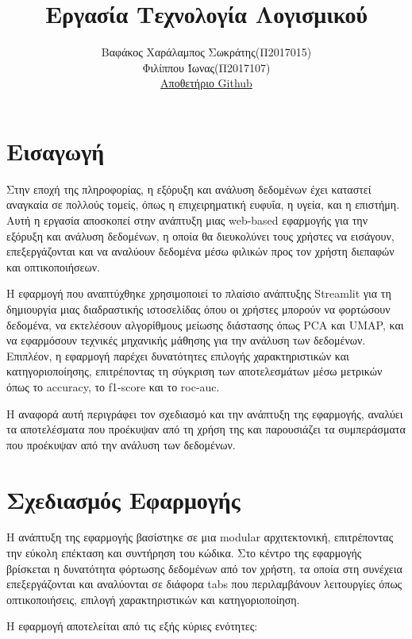 \documentclass[a4paper,12pt]{article}
\title{Εργασία Τεχνολογία Λογισμικού}
\author{Βαφάκος Χαράλαμπος Σωκράτης(Π2017015) \\  Φιλίππου Ίωνας(Π2017107)
\\ \href{https://github.com/Vafakos/HY-320-Software-Engineering-Project}{Αποθετήριο Github}}
\date{}
\begin{document}
\maketitle

\section{Εισαγωγή}
Στην εποχή της πληροφορίας, η εξόρυξη και ανάλυση δεδομένων έχει καταστεί αναγκαία σε πολλούς τομείς, όπως η επιχειρηματική ευφυΐα, η υγεία, και η επιστήμη. Αυτή η εργασία αποσκοπεί στην ανάπτυξη μιας web-based εφαρμογής για την εξόρυξη και ανάλυση δεδομένων, η οποία θα διευκολύνει τους χρήστες να εισάγουν, επεξεργάζονται και να αναλύουν δεδομένα μέσω φιλικών προς τον χρήστη διεπαφών και οπτικοποιήσεων.

Η εφαρμογή που αναπτύχθηκε χρησιμοποιεί το πλαίσιο ανάπτυξης Streamlit για τη δημιουργία μιας διαδραστικής ιστοσελίδας όπου οι χρήστες μπορούν να φορτώσουν δεδομένα, να εκτελέσουν αλγορίθμους μείωσης διάστασης όπως PCA και UMAP, και να εφαρμόσουν τεχνικές μηχανικής μάθησης για την ανάλυση των δεδομένων. Επιπλέον, η εφαρμογή παρέχει δυνατότητες επιλογής χαρακτηριστικών και κατηγοριοποίησης, επιτρέποντας τη σύγκριση των αποτελεσμάτων μέσω μετρικών όπως το accuracy, το f1-score και το roc-auc.

Η αναφορά αυτή περιγράφει τον σχεδιασμό και την ανάπτυξη της εφαρμογής, αναλύει τα αποτελέσματα που προέκυψαν από τη χρήση της και παρουσιάζει τα συμπεράσματα που προέκυψαν από την ανάλυση των δεδομένων.

\newpage

\section{Σχεδιασμός Εφαρμογής}
Η ανάπτυξη της εφαρμογής βασίστηκε σε μια modular αρχιτεκτονική, επιτρέποντας την εύκολη επέκταση και συντήρηση του κώδικα. Στο κέντρο της εφαρμογής βρίσκεται η δυνατότητα φόρτωσης δεδομένων από τον χρήστη, τα οποία στη συνέχεια επεξεργάζονται και αναλύονται σε διάφορα tabs που περιλαμβάνουν λειτουργίες όπως οπτικοποιήσεις, επιλογή χαρακτηριστικών και κατηγοριοποίηση.

Η εφαρμογή αποτελείται από τις εξής κύριες ενότητες:
\end{document}
